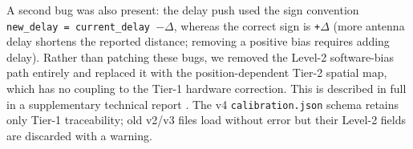 A second bug was also present: the delay push used the sign convention
\texttt{new\_delay = current\_delay $-\Delta$}, whereas the correct sign is
\texttt{+$\Delta$} (more antenna delay shortens the reported distance;
removing a positive bias requires adding delay).
Rather than patching these bugs, we removed the Level-2 software-bias path
entirely and replaced it with the position-dependent Tier-2 spatial map,
which has no coupling to the Tier-1 hardware correction.
This is described in full in a supplementary technical report
.
The v4 \texttt{calibration.json} schema retains only Tier-1 traceability;
old v2/v3 files load without error but their Level-2 fields are discarded
with a warning.
